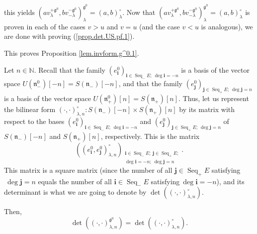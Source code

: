 \documentclass[etingof-lie.tex]{subfiles}
\begin{document}
this yields $\left(  av_{\lambda}^{+\mathfrak{g}^{0}},bv_{-\lambda
}^{-\mathfrak{g}^{0}}\right)  _{\lambda}^{\mathfrak{g}^{0}}=\left(
a,b\right)  _{\lambda}^{\circ}$. Now that $\left(  av_{\lambda}^{+\mathfrak{g}%
^{0}},bv_{-\lambda}^{-\mathfrak{g}^{0}}\right)  _{\lambda}^{\mathfrak{g}^{0}%
}=\left(  a,b\right)  _{\lambda}^{\circ}$ is proven in each of the cases $v>u$
and $v=u$ (and the case $v<u$ is analogous), we are done with proving
(\ref{prop.det.US.pf.1}).

This proves Proposition \ref{lem.invform.g^0.1}.

\begin{corollary}
\label{cor.invform.g^0.1}Let $n\in\mathbb{N}$. Recall that the family $\left(
e_{\mathbf{i}}^{0}\right)  _{\mathbf{i}\in\operatorname*{Seq}\nolimits_{-}%
E;\ \deg\mathbf{i}=-n}$ is a basis of the vector space $U\left(
\mathfrak{n}_{-}^{0}\right)  \left[  -n\right]  =S\left(  \mathfrak{n}%
_{-}\right)  \left[  -n\right]  $, and that the family $\left(  e_{\mathbf{j}%
}^{0}\right)  _{\mathbf{j}\in\operatorname*{Seq}\nolimits_{+}E;\ \deg
\mathbf{j}=n}$ is a basis of the vector space $U\left(  \mathfrak{n}_{+}%
^{0}\right)  \left[  n\right]  =S\left(  \mathfrak{n}_{+}\right)  \left[
n\right]  $. Thus, let us represent the bilinear form $\left(  \cdot
,\cdot\right)  _{\lambda,n}^{\circ}:S\left(  \mathfrak{n}_{-}\right)  \left[
-n\right]  \times S\left(  \mathfrak{n}_{+}\right)  \left[  n\right]  $ by its
matrix with respect to the bases $\left(  e_{\mathbf{i}}^{0}\right)
_{\mathbf{i}\in\operatorname*{Seq}\nolimits_{-}E;\ \deg\mathbf{i}=-n}$ and
$\left(  e_{\mathbf{j}}^{0}\right)  _{\mathbf{j}\in\operatorname*{Seq}%
\nolimits_{+}E;\ \deg\mathbf{j}=n}$ of $S\left(  \mathfrak{n}_{-}\right)
\left[  -n\right]  $ and $S\left(  \mathfrak{n}_{+}\right)  \left[  n\right]
$, respectively. This is the matrix%
\[
\left(  \left(  e_{\mathbf{i}}^{0},e_{\mathbf{j}}^{0}\right)  _{\lambda
,n}^{\circ}\right)  _{\substack{\mathbf{i}\in\operatorname*{Seq}%
\nolimits_{-}E;\ \mathbf{j}\in\operatorname*{Seq}\nolimits_{+}E;\\\deg
\mathbf{i}=-n;\ \deg\mathbf{j}=n}}.
\]
This matrix is a square matrix (since the number of all $\mathbf{j}%
\in\operatorname*{Seq}\nolimits_{+}E$ satisfying$\ \deg\mathbf{j}=n$ equals
the number of all $\mathbf{i}\in\operatorname*{Seq}\nolimits_{-}E$
satisfying$\ \deg\mathbf{i}=-n$), and its determinant is what we are going to
denote by $\det\left(  \left(  \cdot,\cdot\right)  _{\lambda,n}^{\circ
}\right)  $.

Then,%
\[
\det\left(  \left(  \cdot,\cdot\right)  _{\lambda,n}^{\mathfrak{g}^{0}%
}\right)  =\det\left(  \left(  \cdot,\cdot\right)  _{\lambda,n}^{\circ
}\right)  .
\]

\end{corollary}
\end{document}
